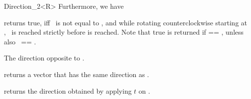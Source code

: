 \begin{ccRefClass} {Direction_2<R>}
Furthermore, we have

       {returns true, iff \ccVar\ is not equal to , and 
        while rotating counterclockwise starting at , 
        \ccVar\ is reached strictly before  is reached.
        Note that true is returned if  == , unless
        also \ccVar\ == .
       }


       {The direction opposite to \ccVar.}


       {returns a vector that has the same direction as \ccVar.}

       {returns the direction obtained by applying $t$ on \ccVar.}


\end{ccRefClass} 

